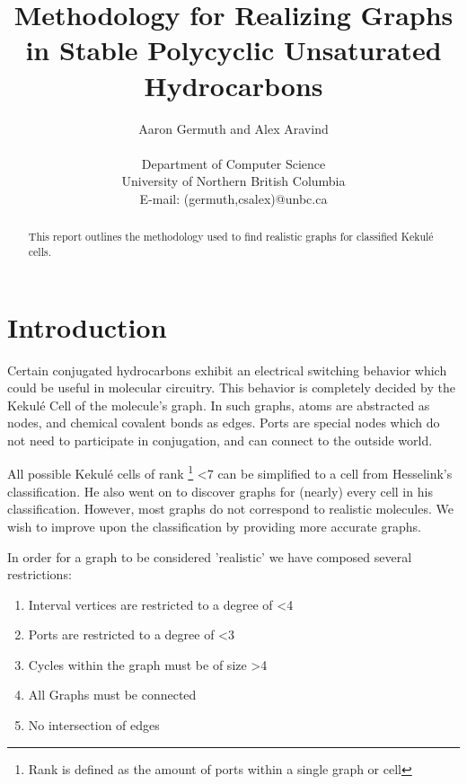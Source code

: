\documentclass[12pt]{article}
\begin{document}
\title{Methodology for Realizing Graphs in Stable Polycyclic Unsaturated Hydrocarbons}
\author{Aaron Germuth and Alex Aravind \\\\  
Department of Computer Science \\
University of Northern British Columbia \\
E-mail: (germuth,csalex)@unbc.ca}
\maketitle


\begin{abstract}

This report outlines the methodology used to find realistic graphs for classified Kekul\'{e} cells.

\end{abstract}

\section{Introduction}

Certain conjugated hydrocarbons exhibit an electrical switching behavior which could be useful in molecular circuitry. This behavior is completely decided by the Kekul\'e Cell of the molecule's graph. In such graphs, atoms are abstracted as nodes, and chemical covalent bonds as edges. Ports are special nodes which do not need to participate in conjugation, and can connect to the outside world. 

All possible Kekul\'e cells of rank
\footnote{Rank is defined as the amount of ports within a single graph or cell} \textless 7 can be simplified to a cell from Hesselink's \cite{H13} classification.
He also went on to discover graphs for (nearly) every cell in his classification. However, most graphs do not correspond to realistic molecules. We wish to improve upon the classification by providing more accurate graphs.

In order for a graph to be considered 'realistic' we have composed several restrictions:
\begin{enumerate}
\item Interval vertices are restricted to a degree of \textless 4
\item Ports are restricted to a degree of \textless 3
\item Cycles within the graph must be of size \textgreater 4
\item All Graphs must be connected
\item No intersection of edges
\end{enumerate}
\end{document}
